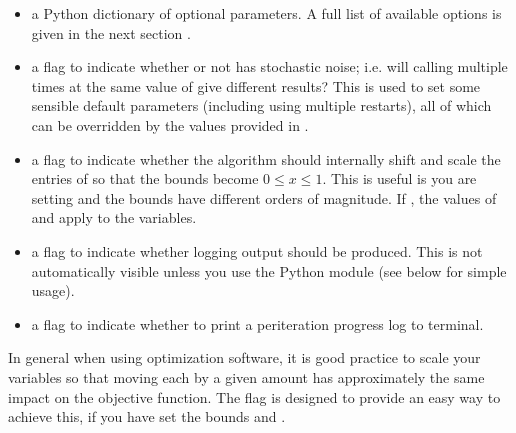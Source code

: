 \documentclass[letterpaper,10pt,english]{sphinxmanual}
\begin{document}
\begin{itemize}
\item {} 
\sphinxAtStartPar
{} \sphinxhyphen{} a Python dictionary  of optional parameters. A full list of available options is given in the next section {\hyperref[\detokenize{advanced::doc}]{}}.

\item {} 
\sphinxAtStartPar
{} \sphinxhyphen{} a flag to indicate whether or not  has stochastic noise; i.e. will calling  multiple times at the same value of  give different results? This is used to set some sensible default parameters (including using multiple restarts), all of which can be overridden by the values provided in .

\item {} 
\sphinxAtStartPar
{} \sphinxhyphen{} a flag to indicate whether the algorithm should internally shift and scale the entries of  so that the bounds become \(0 \leq x \leq 1\). This is useful is you are setting  and the bounds have different orders of magnitude. If , the values of  and  apply to the  variables.

\item {} 
\sphinxAtStartPar
{} \sphinxhyphen{} a flag to indicate whether logging output should be produced. This is not automatically visible unless you use the Python  module (see below for simple usage).

\item {} 
\sphinxAtStartPar
{} \sphinxhyphen{} a flag to indicate whether to print a per\sphinxhyphen{}iteration progress log to terminal.

\end{itemize}

\sphinxAtStartPar
In general when using optimization software, it is good practice to scale your variables so that moving each by a given amount has approximately the same impact on the objective function.
The  flag is designed to provide an easy way to achieve this, if you have set the bounds  and .
\end{document}
